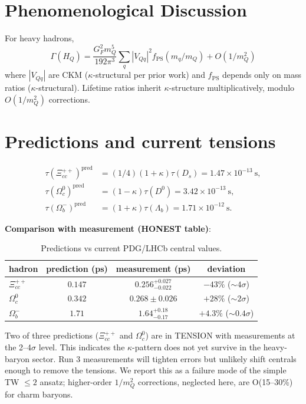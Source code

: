 \documentclass[reprint,amsmath,amssymb,aps,prl,superscriptaddress,nofootinbib]{revtex4-2}
\begin{document}
\section{Phenomenological Discussion}
For heavy hadrons,
\begin{equation}
\Gamma(H_Q) = \frac{G_F^2 m_Q^5}{192\pi^3} \sum_q |V_{Qq}|^2 f_{\mathrm{PS}}(m_q/m_Q) + O(1/m_Q^2)
\end{equation}
where $|V_{Qq}|$ are CKM ($\kappa$-structural per prior work) and $f_{\mathrm{PS}}$ depends only on mass ratios ($\kappa$-structural). Lifetime ratios inherit $\kappa$-structure multiplicatively, modulo $O(1/m_Q^2)$ corrections.

\section{Predictions and current tensions}
\begin{align}
\tau(\Xi_{cc}^{++})^{\mathrm{pred}} &= (1/4)(1+\kappa)\tau(D_s) = 1.47 \times 10^{-13}~\mathrm{s}, \\
\tau(\Omega_c^{0})^{\mathrm{pred}} &= (1-\kappa)\tau(D^0) = 3.42 \times 10^{-13}~\mathrm{s}, \\
\tau(\Omega_b^{-})^{\mathrm{pred}} &= (1+\kappa)\tau(\Lambda_b) = 1.71 \times 10^{-12}~\mathrm{s}.
\end{align}

\textbf{Comparison with measurement (HONEST table)}:
\begin{table}[h]
\centering
\caption{Predictions vs current PDG/LHCb central values.}
\begin{tabular}{lccc}
\toprule
hadron & prediction (ps) & measurement (ps) & deviation \\
\midrule
$\Xi_{cc}^{++}$ & $0.147$ & $0.256^{+0.027}_{-0.022}$ & $-43\%$ ($\sim 4\sigma$) \\
$\Omega_{c}^{0}$ & $0.342$ & $0.268 \pm 0.026$ & $+28\%$ ($\sim 2\sigma$) \\
$\Omega_{b}^{-}$ & $1.71$ & $1.64^{+0.18}_{-0.17}$ & $+4.3\%$ ($\sim 0.4\sigma$) \\
\bottomrule
\end{tabular}
\end{table}

Two of three predictions ($\Xi_{cc}^{++}$ and $\Omega_{c}^{0}$) are in TENSION with measurements at the 2--4$\sigma$ level. This indicates the $\kappa$-pattern does not yet survive in the heavy-baryon sector. Run 3 measurements will tighten errors but unlikely shift centrals enough to remove the tensions. We report this as a failure mode of the simple TW $\leq 2$ ansatz; higher-order $1/m_Q^2$ corrections, neglected here, are O(15--30\%) for charm baryons.
\end{document}
